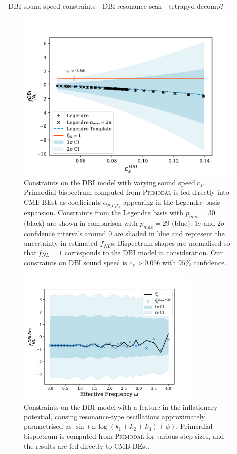 - DBI sound speed constraints
- DBI resonance scan
- tetrapyd decomp? 

\begin{figure}[htbp!] 
	\centering    
	\includegraphics[width=\textwidth]{dbi_sound_speed_scan_annotated_new.pdf}
	\caption{Constraints on the DBI model with varying sound speed $c_s$. Primordial bispectrum computed from \textsc{Primodal} is fed directly into CMB-BEst as coefficients $\alpha_{p_1 p_2 p_3}$ appearing in the Legendre basis expansion. Constraints from the Legendre basis with $p_{max}=30$ (black) are shown in comparison with $p_{max}=29$ (blue). $1\sigma$ and $2\sigma$ confidence intervals around $0$ are shaded in blue and represent the uncertainty in estimated $f_{NL}$s. Bispectrum shapes are normalised so that $f_{NL}=1$ corresponds to the DBI model in consideration. Our constraints on DBI sound speed is $c_s > 0.056$ with $95\%$ confidence.}
	\label{fig:dbi_sound_speed_scan}
\end{figure}

\begin{figure}[htbp!] 
	\centering    
	\includegraphics[width=0.8\textwidth]{dbi_reso_scan_fNLs_new.pdf}
	\caption{Constraints on the DBI model with a feature in the inflationary potential, causing resonance-type oscillations approximately parametrised as $\sin(\omega \log(k_1+k_2+k_3) + \phi)$. Primordial bispectrum is computed from \textsc{Primodal} for various step sizes, and the results are fed directly to CMB-BEst.}
	\label{fig:dbi_resonance_scan}
\end{figure}

